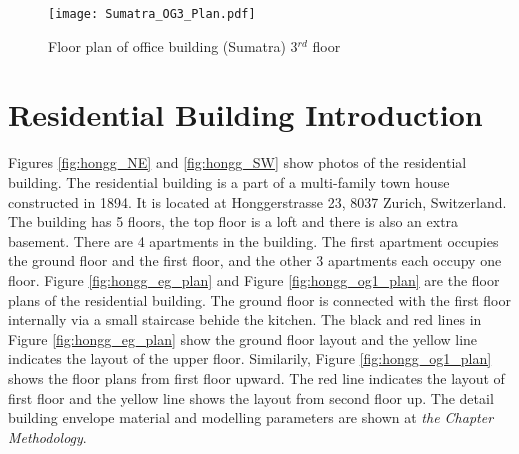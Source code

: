 \documentclass[a4paper, oneside]{discothesis}
\begin{document}
		\begin{figure}[ht!]
		  \centering
		  \texttt{[image: Sumatra\_OG3\_Plan.pdf]}
		  \caption{Floor plan of office building (Sumatra) 3$^{rd}$ floor}
		  \label{fig:sumatra_og3}
		\end{figure}
	
	\newpage	
	\section{Residential Building Introduction}
		Figures \ref{fig:hongg_NE} and \ref{fig:hongg_SW} show photos of the residential building. The residential building is a part of a multi-family town house constructed in 1894. It is located at Honggerstrasse 23, 8037 Zurich, Switzerland. The building has 5 floors, the top floor is a loft and there is also an extra basement. There are 4 apartments in the building. The first apartment occupies the ground floor and the first floor, and the other 3 apartments each occupy one floor. Figure \ref{fig:hongg_eg_plan} and Figure \ref{fig:hongg_og1_plan} are the floor plans of the residential building. The ground floor is connected with the first floor internally via a small staircase behide the kitchen. The black and red lines in Figure \ref{fig:hongg_eg_plan} show the ground floor layout and the yellow line indicates the layout of the upper floor. Similarily, Figure \ref{fig:hongg_og1_plan} shows the floor plans from first floor upward. The  red line indicates the layout of first floor and the yellow line shows the layout from second floor up. The detail building envelope material and modelling parameters are shown at \textit{the Chapter Methodology}.\\
		
\end{document}
